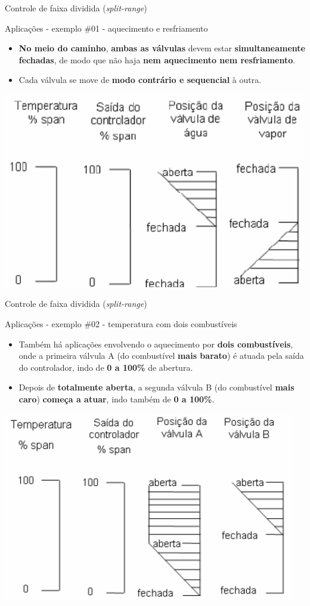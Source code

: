 \begin{frame}{Controle de faixa dividida (\textit{split-range})}
	\begin{block}{Aplicações - exemplo \#01 - aquecimento e resfriamento}
		\begin{itemize}
			\item \textbf{No meio do caminho}, \textbf{ambas as válvulas} devem estar \textbf{simultaneamente fechadas}, de modo que não haja \textbf{nem aquecimento nem resfriamento}.
			\item Cada válvula se move de \textbf{modo contrário e sequencial} à outra.
		\end{itemize}
	\end{block}
	
	\centering
	\includegraphics[width=0.6\linewidth]{Figuras/Ch15/fig12}
\end{frame}


\begin{frame}{Controle de faixa dividida (\textit{split-range})}
	\begin{block}{Aplicações - exemplo \#02 - temperatura com dois combustíveis}
		\begin{itemize}
			\item Também há aplicações envolvendo o aquecimento por \textbf{dois combustíveis}, onde a primeira válvula A (do combustível \textbf{mais barato}) é atuada pela saída do controlador, indo de \textbf{0 a 100\%} de abertura.
			\item Depois de \textbf{totalmente aberta}, a segunda válvula B (do combustível \textbf{mais caro}) \textbf{começa a atuar}, indo também de \textbf{0 a 100\%}.
		\end{itemize}
	\end{block}

	\centering
	\includegraphics[width=0.5\linewidth]{Figuras/Ch15/fig13}
\end{frame}


